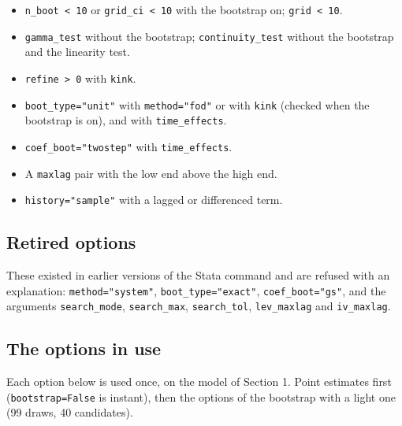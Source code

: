 \documentclass[
  10.5pt,
  a4paper,
]{article}
\providecommand{\tightlist}{%
  \setlength{\itemsep}{0pt}\setlength{\parskip}{0pt}}
\begin{document}
\begin{itemize}
\tightlist
\item
  \texttt{n\_boot\ \textless{}\ 10} or
  \texttt{grid\_ci\ \textless{}\ 10} with the bootstrap on;
  \texttt{grid\ \textless{}\ 10}.
\item
  \texttt{gamma\_test} without the bootstrap; \texttt{continuity\_test}
  without the bootstrap and the linearity test.
\item
  \texttt{refine\ \textgreater{}\ 0} with \texttt{kink}.
\item
  \texttt{boot\_type="unit"} with \texttt{method="fod"} or with
  \texttt{kink} (checked when the bootstrap is on), and with
  \texttt{time\_effects}.
\item
  \texttt{coef\_boot="twostep"} with \texttt{time\_effects}.
\item
  A \texttt{maxlag} pair with the low end above the high end.
\item
  \texttt{history="sample"} with a lagged or differenced term.
\end{itemize}

\subsection{Retired options}\label{retired-options}

These existed in earlier versions of the Stata command and are refused
with an explanation: \texttt{method="system"},
\texttt{boot\_type="exact"}, \texttt{coef\_boot="gs"}, and the arguments
\texttt{search\_mode}, \texttt{search\_max}, \texttt{search\_tol},
\texttt{lev\_maxlag} and \texttt{iv\_maxlag}.

\subsection{The options in use}\label{the-options-in-use}

Each option below is used once, on the model of Section 1. Point
estimates first (\texttt{bootstrap=False} is instant), then the options
of the bootstrap with a light one (99 draws, 40 candidates).
\end{document}
